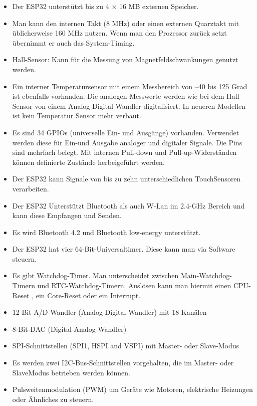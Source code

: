 \textbf{}
\begin{itemize}
    \item Der ESP32 unterstützt bis zu 4 × 16 MB externen Speicher.
    \item Man kann den internen Takt (8 MHz) oder einen
    externen Quarztakt mit üblicherweise 160 MHz nutzen. 
    Wenn man den Prozessor zurück setzt übernimmt er auch das System-Timing.
    \item Hall-Sensor: Kann für die Messung von Magnetfeldschwankungen genutzt werden.
    \item Ein interner Temperatursensor mit einem Messbereich von –40 bis 125 Grad ist ebenfalls vorhanden.
    Die analogen Messwerte werden wie bei dem Hall-Sensor
    von einem Analog-Digital-Wandler digitalisiert. 
    In neueren Modellen ist kein Temperatur Sensor mehr verbaut.
    \item Es sind 34 GPIOs (universelle Ein- und Ausgänge) vorhanden. 
    Verwendet werden diese für Ein-und Ausgabe analoger und digitaler Signale. 
    Die Pins sind mehrfach belegt. 
    Mit internen Pull-down und Pull-up-Widerständen können definierte Zustände herbeigeführt werden.
    \item Der ESP32 kann Signale von bis zu zehn unterschiedlichen TouchSensoren verarbeiten. 
    \item Der ESP32 Unterstützt Bluetooth als auch W-Lan im 2.4-GHz Bereich und kann diese 
    Empfangen und Senden. 
    \item Es wird Bluetooth 4.2 und Bluetooth low-energy unterstützt.
    \item Der ESP32 hat vier 64-Bit-Universaltimer. Diese kann man via Software steuern.
    \item Es gibt Watchdog-Timer. Man unterscheidet zwischen Main-Watchdog-Timern und RTC-Watchdog-Timern. 
    Auslösen kann man hiermit einen CPU-Reset , ein Core-Reset oder ein Interrupt.
    \item  12-Bit-A/D-Wandler (Analog-Digital-Wandler) mit 18 Kanälen 
    \item  8-Bit-DAC (Digital-Analog-Wandler)
    \item SPI-Schnittstellen (SPI1, HSPI and VSPI) mit Master- oder Slave-Modus
    \item Es werden zwei I2C-Bus-Schnittstellen vorgehalten, die im Master- oder SlaveModus betrieben werden können.
    \item Pulsweitenmodulation (PWM) um Geräte wie Motoren, elektrische Heizungen oder Ähnliches zu steuern. 
    
\end{itemize}
\cite{esp32Chip}

